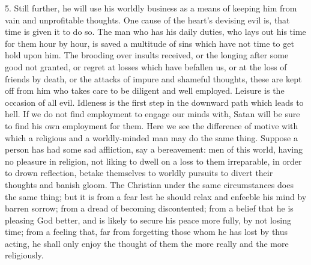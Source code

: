 5. Still further, he will use his worldly business as a means of
keeping him from vain and unprofitable thoughts. One cause of the
heart's devising evil is, that time is given it to do so. The man who
has his daily duties, who lays out his time for them hour by hour, is
saved a multitude of sins which have not time to get hold upon him.
The brooding over insults received, or the longing after some good not
granted, or regret at losses which have befallen us, or at the loss of
friends by death, or the attacks of impure and shameful thoughts,
these are kept off from him who takes care to be diligent and well
employed. Leisure is the occasion of all evil. Idleness is the first
step in the downward path which leads to hell. If we do not find
employment to engage our minds with, Satan will be sure to find his
own employment for them. Here we see the difference of motive with
which a religious and a worldly-minded man may do the same thing.
Suppose a person has had some sad affliction, say a bereavement: men
of this world, having no pleasure in religion, not liking to dwell on
a loss to them irreparable, in order to drown reflection, betake
themselves to worldly pursuits to divert their thoughts and banish
gloom. The Christian under the same circumstances does the same thing;
but it is from a fear lest he should relax and enfeeble his mind by
barren sorrow; from a dread of becoming discontented; from a belief
that he is pleasing God better, and is likely to secure his peace more
fully, by not losing time; from a feeling that, far from forgetting
those whom he has lost by thus acting, he shall only enjoy the thought
of them the more really and the more religiously.

